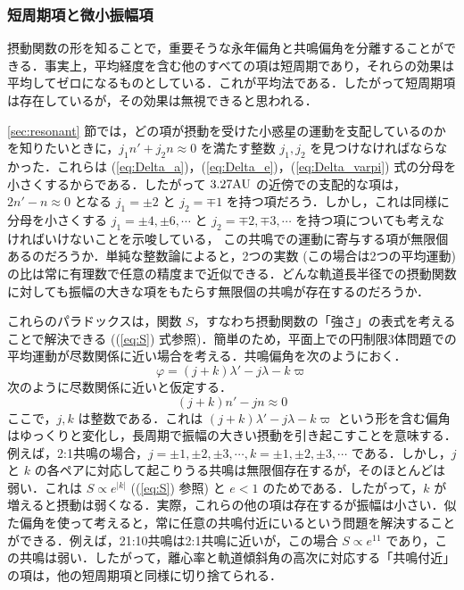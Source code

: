 \documentclass[11pt,a4paper,oneside,onecolumn]{jarticle}
\begin{document}
\subsubsection{短周期項と微小振幅項}
摂動関数の形を知ることで，重要そうな永年偏角と共鳴偏角を分離することができる．事実上，平均経度を含む他のすべての項は短周期であり，それらの効果は平均してゼロになるものとしている．これが平均法である．したがって短周期項は存在しているが，その効果は無視できると思われる．

\ref{sec:resonant} 節では，どの項が摂動を受けた小惑星の運動を支配しているのかを知りたいときに，$j_1 n' + j_2 n \approx 0$ を満たす整数 $j_1, j_2$ を見つけなければならなかった．これらは (\ref{eq:Delta_a})，(\ref{eq:Delta_e})，(\ref{eq:Delta_varpi}) 式の分母を小さくするからである．したがって $3.27 {\rm AU}$ の近傍での支配的な項は，$2 n' - n \approx 0$ となる $j_1 = \pm 2$ と $j_2 = \mp 1$ を持つ項だろう．しかし，これは同様に分母を小さくする $j_1 = \pm 4, \pm 6, \cdots$ と $j_2 = \mp 2, \mp 3, \cdots$ を持つ項についても考えなければいけないことを示唆している，  
この共鳴での運動に寄与する項が無限個あるのだろうか．単純な整数論によると，2つの実数 (この場合は2つの平均運動) の比は常に有理数で任意の精度まで近似できる．どんな軌道長半径での摂動関数に対しても振幅の大きな項をもたらす無限個の共鳴が存在するのだろうか．

これらのパラドックスは，関数 $S$，すなわち摂動関数の「強さ」の表式を考えることで解決できる ((\ref{eq:S}) 式参照)．簡単のため，平面上での円制限3体問題での平均運動が尽数関係に近い場合を考える．共鳴偏角を次のようにおく．
\begin{equation}
\varphi = (j + k) \lambda' - j \lambda - k \varpi
\end{equation}
次のように尽数関係に近いと仮定する．
\begin{equation}
(j + k) n' - j n \approx 0
\end{equation}
ここで，$j, k$ は整数である．これは $(j + k) \lambda' - j \lambda - k \varpi$ という形を含む偏角はゆっくりと変化し，長周期で振幅の大きい摂動を引き起こすことを意味する．例えば，2:1共鳴の場合，$j = \pm 1, \pm 2, \pm 3, \cdots, k = \pm 1, \pm 2, \pm 3, \cdots$ である．しかし，$j$ と $k$ の各ペアに対応して起こりうる共鳴は無限個存在するが，そのほとんどは弱い．これは $S \propto e^{|k|}$ ((\ref{eq:S}) 参照) と $e < 1$ のためである．したがって，$k$ が増えると摂動は弱くなる．実際，これらの他の項は存在するが振幅は小さい．似た偏角を使って考えると，常に任意の共鳴付近にいるという問題を解決することができる．例えば，21:10共鳴は2:1共鳴に近いが，この場合 $S \propto e^{11}$ であり，この共鳴は弱い．したがって，離心率と軌道傾斜角の高次に対応する「共鳴付近」の項は，他の短周期項と同様に切り捨てられる．
\end{document}
